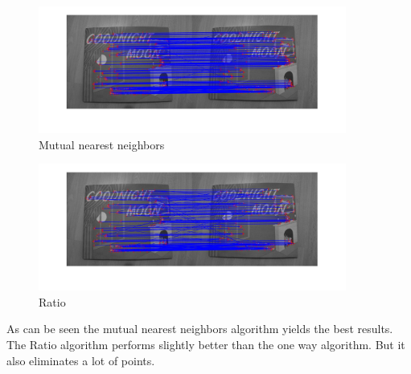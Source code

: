 \documentclass[12pt]{article}
\begin{document}
\begin{figure}[ht]
	\centering
	\includegraphics[width=0.9\textwidth]{23.jpg}
	\caption{Mutual nearest neighbors }
	\label{fig1}
\end{figure}
\begin{figure}[ht]
	\centering
	\includegraphics[width=0.9\textwidth]{24.jpg}
	\caption{Ratio}
	\label{fig1}
\end{figure}
\vspace{5mm}

As can be seen the mutual nearest neighbors algorithm yields the best results. The Ratio algorithm performs slightly better than the one way algorithm. But it also eliminates a lot of points. 
\end{document}
